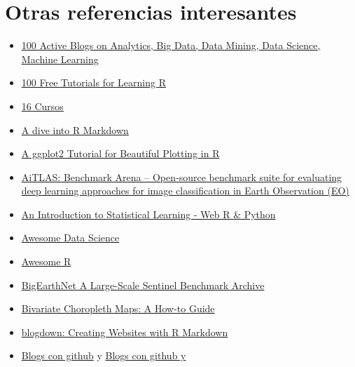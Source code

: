 \documentclass[
  letterpaper,
  DIV=11,
  numbers=noendperiod]{scrartcl}
\providecommand{\tightlist}{%
  \setlength{\itemsep}{0pt}\setlength{\parskip}{0pt}}
\begin{document}
\section{Otras referencias
interesantes}\label{otras-referencias-interesantes}

\begin{itemize}
\tightlist
\item
  \href{https://www.kdnuggets.com/2016/03/100-active-blogs-analytics-big-data-science-machine-learning.html\#.VvqjkSV5Tio.linkedin}{100
  Active Blogs on Analytics, Big Data, Data Mining, Data Science,
  Machine Learning}
\item
  \href{https://www.listendata.com/p/r-programming-tutorials.html}{100
  Free Tutorials for Learning R}
\item
  \href{https://www.analyticsvidhya.com/blog/2016/10/16-new-must-watch-tutorials-courses-on-machine-learning/?utm_source=feedburner&utm_medium=email&utm_campaign=Feed\%3A+AnalyticsVidhya+\%28Analytics+Vidhya\%29}{16
  Cursos}
\item
  \href{http://cfss.uchicago.edu/program_rmarkdown.html}{A dive into R
  Markdown}
\item
  \href{https://cedricscherer.netlify.app/2019/08/05/a-ggplot2-tutorial-for-beautiful-plotting-in-r/}{A
  ggplot2 Tutorial for Beautiful Plotting in R}
\item
  \href{https://github.com/biasvariancelabs/aitlas-arena}{AiTLAS:
  Benchmark Arena -- Open-source benchmark suite for evaluating deep
  learning approaches for image classification in Earth Observation
  (EO)}
\item
  \href{https://www.statlearning.com/}{An Introduction to Statistical
  Learning - Web R \& Python}
\item
  \href{https://github.com/academic/awesome-datascience}{Awesome Data
  Science}
\item
  \href{https://github.com/qinwf/awesome-R}{Awesome R}
\item
  \href{https://bigearth.net/}{BigEarthNet A Large-Scale Sentinel
  Benchmark Archive}
\item
  \href{https://www.joshuastevens.net/cartography/make-a-bivariate-choropleth-map/}{Bivariate
  Choropleth Maps: A How-to Guide}
\item
  \href{https://bookdown.org/yihui/blogdown/}{blogdown: Creating
  Websites with R Markdown}
\item
  \href{http://jmcglone.com/guides/github-pages/}{Blogs con github} y
  \href{http://andysouth.github.io/blog-setup/}{Blogs con github y
}
\end{itemize}
\end{document}
